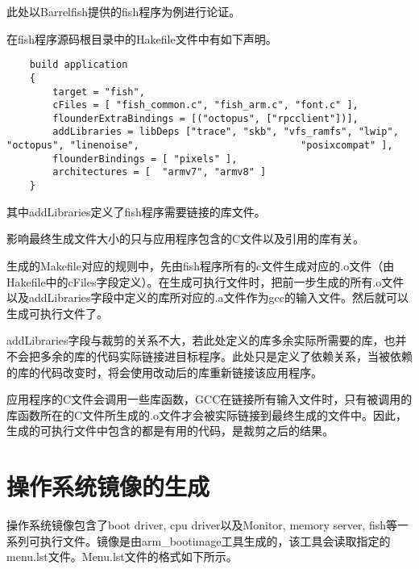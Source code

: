 \documentclass[a4paper, 12pt]{report}
\begin{document}
    此处以Barrelfish提供的fish程序为例进行论证。

    在fish程序源码根目录中的Hakefile文件中有如下声明。
    
    \begin{lstlisting}
    build application 
    { 
        target = "fish",
        cFiles = [ "fish_common.c", "fish_arm.c", "font.c" ],
        flounderExtraBindings = [("octopus", ["rpcclient"])],	
        addLibraries = libDeps ["trace", "skb", "vfs_ramfs", "lwip", "octopus", "linenoise", 							"posixcompat" ],
        flounderBindings = [ "pixels" ],
        architectures = [  "armv7", "armv8" ]              
    }
    \end{lstlisting}
    
    其中addLibraries定义了fish程序需要链接的库文件。

    影响最终生成文件大小的只与应用程序包含的C文件以及引用的库有关。

    生成的Makefile对应的规则中，先由fish程序所有的c文件生成对应的.o文件（由Hakefile中的cFiles字段定义）。在生成可执行文件时，把前一步生成的所有.o文件以及addLibraries字段中定义的库所对应的.a文件作为gcc的输入文件。然后就可以生成可执行文件了。

    addLibraries字段与裁剪的关系不大，若此处定义的库多余实际所需要的库，也并不会把多余的库的代码实际链接进目标程序。此处只是定义了依赖关系，当被依赖的库的代码改变时，将会使用改动后的库重新链接该应用程序。

    应用程序的C文件会调用一些库函数，GCC在链接所有输入文件时，只有被调用的库函数所在的C文件所生成的.o文件才会被实际链接到最终生成的文件中。因此，生成的可执行文件中包含的都是有用的代码，是裁剪之后的结果。
    
    \section{操作系统镜像的生成}
    
    操作系统镜像包含了boot driver, cpu driver以及Monitor, memory server, fish等一系列可执行文件。镜像是由arm\_bootimage工具生成的，该工具会读取指定的menu.lst文件。Menu.lst文件的格式如下所示。
    
\end{document}
